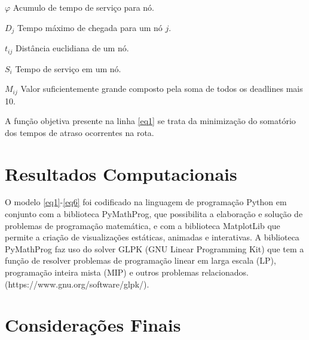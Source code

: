 \documentclass[12pt]{article}
\begin{document}
    $\varphi$ Acumulo de tempo de serviço para nó.
    
    $D_j$ Tempo máximo de chegada para um nó $j$.
    
    $t_{ij}$ Distância euclidiana de um nó.
    
    $S_i$ Tempo de serviço em um nó.
    
    $M_{ij}$ Valor suficientemente grande composto pela soma de todos os deadlines mais 10.
    
    A função objetiva presente na linha \eqref{eq1} se trata da minimização do somatório dos tempos de atraso ocorrentes na rota.

\section{Resultados Computacionais}
    O modelo \eqref{eq1}-\eqref{eq6} foi codificado na linguagem de programação Python em conjunto com a biblioteca PyMathProg, que possibilita a elaboração e solução de problemas de programação matemática, e com a biblioteca MatplotLib que permite a criação de visualizações estáticas, animadas e interativas.
    A biblioteca PyMathProg faz uso do solver GLPK (GNU Linear Programming Kit) que tem a função de resolver problemas de programação linear em larga escala (LP), programação inteira mista (MIP) e outros problemas relacionados. (https://www.gnu.org/software/glpk/).
    
    
    


\section{Considerações Finais}




\end{document}
